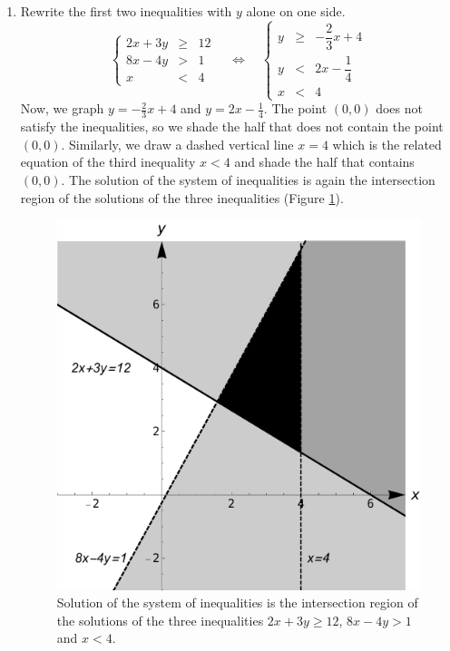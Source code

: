 \begin{example}
\begin{enumerate}
\item Rewrite the first two inequalities with $y$ alone on one side.
\[\left\{ \begin{array}{rcl} 2x+3y &\geq& 12 \\ 8x-4y &>& 1 \\ x &<& 4  \end{array} \right. \quad \Leftrightarrow \quad \left\{ \begin{array}{rcl} y &\geq& -\dfrac{2}{3}x+4 \\ y&<&2x -\dfrac{1}{4} \\ x &<& 4  \end{array} \right. \]
Now, we graph $y =-\frac{2}{3}x+4$ and $y=2x -\frac{1}{4}$. The point $(0,0)$ does not satisfy the inequalities, so we shade the half that does not contain the point $(0,0)$. 
Similarly, we draw a dashed vertical line $x=4$ which is the related equation of the third inequality $x<4$ and shade the half that contains $(0,0)$.
The solution of the system of inequalities is again the intersection region of the solutions of the three inequalities (Figure \ref{fig_Systems_lin_eq_7}).
\begin{figure}[H]
	\centering
	\includegraphics[scale=0.4]{fig_Systems_lin_eq_7}
	\caption{Solution of the system of inequalities is the intersection region of the solutions of the three inequalities $2x+3y\geq 12$, $8x-4y> 1$ and $x < 4$.}
	\label{fig_Systems_lin_eq_7}
\end{figure}


\end{enumerate}

\end{example}



